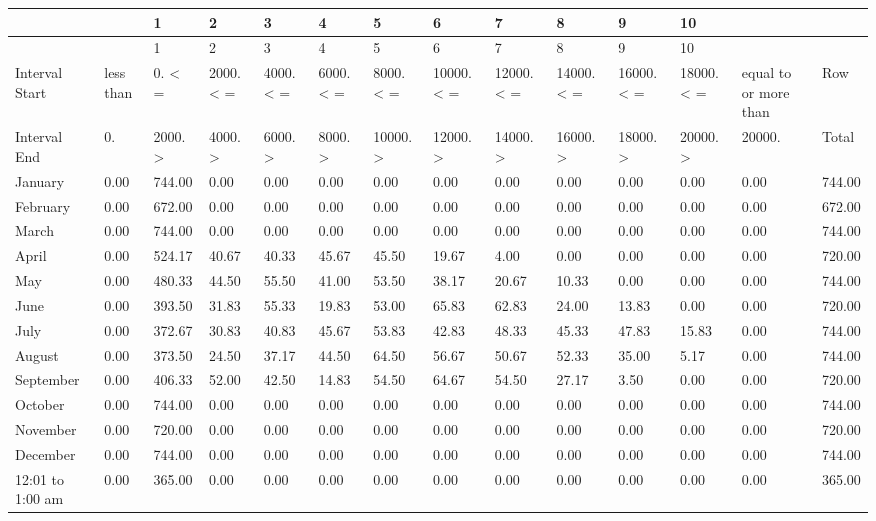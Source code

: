 {\tiny
\begin{longtable}[c]{>{\raggedright}p{0.42in}>{\raggedright}p{0.42in}>{\raggedright}p{0.42in}>{\raggedright}p{0.42in}>{\raggedright}p{0.42in}>{\raggedright}p{0.42in}>{\raggedright}p{0.42in}>{\raggedright}p{0.42in}>{\raggedright}p{0.42in}>{\raggedright}p{0.42in}>{\raggedright}p{0.42in}>{\raggedright}p{0.42in}>{\raggedright}p{0.42in}>{\raggedright}p{0.42in}}
\toprule
~ & ~ & 1 & 2 & 3 & 4 & 5 & 6 & 7 & 8 & 9 & 10 & ~ & ~ \tabularnewline
\midrule
\endfirsthead

\toprule
~ & ~ & 1 & 2 & 3 & 4 & 5 & 6 & 7 & 8 & 9 & 10 & ~ & ~ \tabularnewline
\midrule
\endhead

Interval Start & less than & 0. < = & 2000. < = & 4000. < = & 6000. < = & 8000. < = & 10000. < = & 12000. < = & 14000. < = & 16000. < = & 18000. < = & equal to or more than & Row \tabularnewline
Interval End & 0. & 2000. > & 4000. > & 6000. > & 8000. > & 10000. > & 12000. > & 14000. > & 16000. > & 18000. > & 20000. > & 20000. & Total \tabularnewline
January & 0.00 & 744.00 & 0.00 & 0.00 & 0.00 & 0.00 & 0.00 & 0.00 & 0.00 & 0.00 & 0.00 & 0.00 & 744.00 \tabularnewline
February & 0.00 & 672.00 & 0.00 & 0.00 & 0.00 & 0.00 & 0.00 & 0.00 & 0.00 & 0.00 & 0.00 & 0.00 & 672.00 \tabularnewline
March & 0.00 & 744.00 & 0.00 & 0.00 & 0.00 & 0.00 & 0.00 & 0.00 & 0.00 & 0.00 & 0.00 & 0.00 & 744.00 \tabularnewline
April & 0.00 & 524.17 & 40.67 & 40.33 & 45.67 & 45.50 & 19.67 & 4.00 & 0.00 & 0.00 & 0.00 & 0.00 & 720.00 \tabularnewline
May & 0.00 & 480.33 & 44.50 & 55.50 & 41.00 & 53.50 & 38.17 & 20.67 & 10.33 & 0.00 & 0.00 & 0.00 & 744.00 \tabularnewline
June & 0.00 & 393.50 & 31.83 & 55.33 & 19.83 & 53.00 & 65.83 & 62.83 & 24.00 & 13.83 & 0.00 & 0.00 & 720.00 \tabularnewline
July & 0.00 & 372.67 & 30.83 & 40.83 & 45.67 & 53.83 & 42.83 & 48.33 & 45.33 & 47.83 & 15.83 & 0.00 & 744.00 \tabularnewline
August & 0.00 & 373.50 & 24.50 & 37.17 & 44.50 & 64.50 & 56.67 & 50.67 & 52.33 & 35.00 & 5.17 & 0.00 & 744.00 \tabularnewline
September & 0.00 & 406.33 & 52.00 & 42.50 & 14.83 & 54.50 & 64.67 & 54.50 & 27.17 & 3.50 & 0.00 & 0.00 & 720.00 \tabularnewline
October & 0.00 & 744.00 & 0.00 & 0.00 & 0.00 & 0.00 & 0.00 & 0.00 & 0.00 & 0.00 & 0.00 & 0.00 & 744.00 \tabularnewline
November & 0.00 & 720.00 & 0.00 & 0.00 & 0.00 & 0.00 & 0.00 & 0.00 & 0.00 & 0.00 & 0.00 & 0.00 & 720.00 \tabularnewline
December & 0.00 & 744.00 & 0.00 & 0.00 & 0.00 & 0.00 & 0.00 & 0.00 & 0.00 & 0.00 & 0.00 & 0.00 & 744.00 \tabularnewline
12:01 to 1:00 am & 0.00 & 365.00 & 0.00 & 0.00 & 0.00 & 0.00 & 0.00 & 0.00 & 0.00 & 0.00 & 0.00 & 0.00 & 365.00 \tabularnewline

\end{longtable}}
